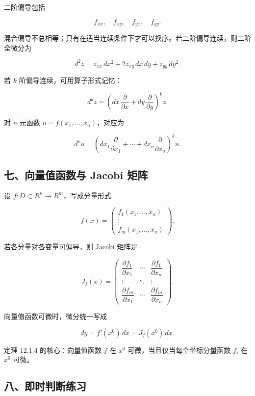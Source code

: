 二阶偏导包括

\[
      f_{xx},\quad f_{xy},\quad f_{yx},\quad f_{yy}.
    \]

混合偏导不总相等；只有在适当连续条件下才可以换序。若二阶偏导连续，则二阶全微分为

\[
      d^2z=z_{xx}\,dx^2+2z_{xy}\,dx\,dy+z_{yy}\,dy^2.
    \]

若 \(k\) 阶偏导连续，可用算子形式记忆：

\[
      d^kz=\left(dx\,\frac{\partial}{\partial x}+dy\,\frac{\partial}{\partial y}\right)^kz.
    \]

对 \(n\) 元函数 \(u=f(x_1,\ldots,x_n)\)，对应为

\[
      d^ku=
      \left(dx_1\frac{\partial}{\partial x_1}+\cdots+
      dx_n\frac{\partial}{\partial x_n}\right)^ku.
    \]

\subsection*{七、向量值函数与 Jacobi 矩阵}

设 \(f:D\subset R^n\to R^m\)，写成分量形式

\[
      f(x)=
      \begin{pmatrix}
      f_1(x_1,\ldots,x_n)\\
      \vdots\\
      f_m(x_1,\ldots,x_n)
      \end{pmatrix}.
    \]

若各分量对各变量可偏导，则 Jacobi 矩阵是

\[
      J_f(x)=
      \begin{pmatrix}
      \dfrac{\partial f_1}{\partial x_1} & \cdots & \dfrac{\partial f_1}{\partial x_n}\\
      \vdots & \ddots & \vdots\\
      \dfrac{\partial f_m}{\partial x_1} & \cdots & \dfrac{\partial f_m}{\partial x_n}
      \end{pmatrix}.
    \]

向量值函数可微时，微分统一写成

\[
      dy=f'(x^0)\,dx=J_f(x^0)\,dx.
    \]

定理 12.1.4 的核心：向量值函数 \(f\) 在 \(x^0\) 可微，当且仅当每个坐标分量函数 \(f_i\) 在 \(x^0\) 可微。

\subsection*{八、即时判断练习}

